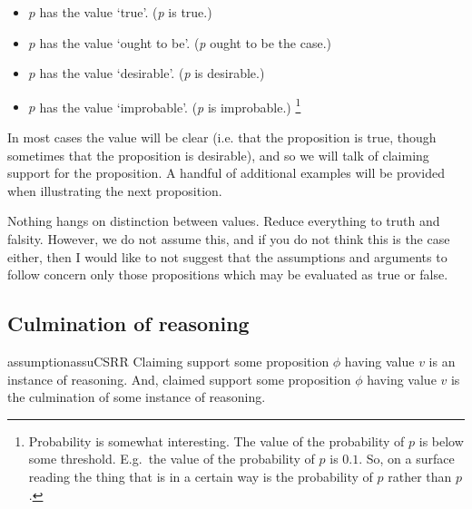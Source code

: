 \begin{note}
    \begin{itemize}
  \item \(p\) has the value `true'. \hfill (\emph{p} is true.)
  \item \(p\) has the value `ought to be'. \hfill (\emph{p} ought to be the case.)
  \item \(p\) has the value `desirable'. \hfill (\emph{p} is desirable.)
  \item \(p\) has the value `improbable'. \hfill (\emph{p} is improbable.)\nolinebreak
    \footnote{
      Probability is somewhat interesting.
      The value of the probability of \(p\) is below some threshold.
      E.g.\ the value of the probability of \(p\) is \(0.1\).
      So, on a surface reading the thing that is in a certain way is the probability of \(p\) rather than \(p\).
    }
  \end{itemize}
\end{note}

\begin{note}
In most cases the value will be clear (i.e. that the proposition is true, though sometimes that the proposition is desirable), and so we will talk of claiming support for the proposition.
  A handful of additional examples will be provided when illustrating the next proposition.
\end{note}

\begin{note}
  Nothing hangs on distinction between values.
  Reduce everything to truth and falsity.
  However, we do not assume this, and if you do not think this is the case either, then I would like to not suggest that the assumptions and arguments to follow concern only those propositions which may be evaluated as true or false.
\end{note}

\subsection{Culmination of reasoning}

\begin{note}
  \begin{restatable}{assumption}{assuCSRR}
    \label{assu:CS-culmination-of-R}
    Claiming support some proposition \(\phi\) having value \(v\) is an instance of reasoning.
    And, claimed support some proposition \(\phi\) having value \(v\) is the culmination of some instance of reasoning.
  \end{restatable}
\end{note}

